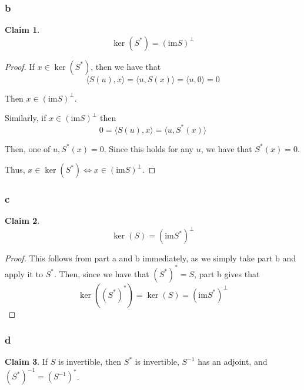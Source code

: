 \documentclass[12pt,letterpaper]{article}
\theoremstyle{definition}
\newtheorem*{claim}{Claim}
\newcommand{\im}{\mathrm{im}}
\begin{document}
\subsubsection*{b}

\begin{claim}
  \[
    \ker(S^*) = (\im S)^\perp
  \]
\end{claim}

\begin{proof}
  If $x \in \ker(S^*)$, then we have that
  \[
    \langle S(u), x \rangle = \langle u, S(x) \rangle = \langle u, 0 \rangle = 0
  \]

  Then $x \in (\im S)^\perp$.

  Similarly, if $x \in (\im S)^\perp$ then
  \[
    0 = \langle S(u), x \rangle = \langle u, S^*(x) \rangle 
  \]

  Then, one of $u, S^*(x) = 0$. Since this holds for any $u$, we have that
  $S^*(x) = 0$.

  Thus, $x \in \ker(S^*) \iff x \in (\im S)^\perp$.
\end{proof}

\subsubsection*{c}

\begin{claim}
  \[
    \ker(S) = (\im S^*)^\perp
  \]
\end{claim}

\begin{proof}
  This follows from part a and b immediately, as we simply take part b and apply
  it to $S^*$. Then, since we have that $(S^*)^* = S$, part b gives that
  \[
    \ker((S^*)^*) = \ker(S) = (\im S^*)^\perp
  \]
\end{proof}

\subsubsection*{d}

\begin{claim}
  If $S$ is invertible, then $S^*$ is invertible, $S^{-1}$ has an adjoint, and
  $(S^*)^{-1} = (S^{-1})^*$.
\end{claim}
\end{document}
